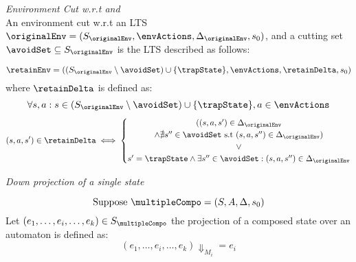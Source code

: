 
\begin{definition} \label{def:envcut} \emph{Environment Cut w.r.t \originalEnv and \avoidSet}\\
An environment cut w.r.t an LTS $\originalEnv = (S_{\originalEnv}, \envActions, \Delta_{\originalEnv}, s_{0})$, 
and a cutting set $\avoidSet \subseteq S_{\originalEnv}$ is the LTS described as follows:
\begin{minipage}[t]{.5\textwidth}
\begin{center}
\[\retainEnv = ((S_{\originalEnv}\setminus \avoidSet)\cup \{ \trapState \}, \envActions, \retainDelta, s_{0})\]
where $\retainDelta$ is defined as:
\[\forall s,a: s \in (S_{\originalEnv}\setminus \avoidSet)\cup \{ \trapState \}, a \in \envActions\]
\[
  (s,a,s') \in \retainDelta \iff \left\{\def\arraystretch{1.2}%
  \begin{array}{@{}c@{}}
    ((s,a,s') \in \Delta_{\originalEnv} \\
    \wedge \nexists s'' \in \avoidSet \text{ s.t } (s,a,s'') \in \Delta_{\originalEnv})\\
    \vee \\
    s' = \trapState \wedge \exists s'' \in \avoidSet: (s, a, s'') \in \Delta_{\originalEnv}\\
  \end{array}\right.
\]
\end{center}
\end{minipage}
\end{definition}


\begin{definition} \label{def:downProjectionState} \emph{Down projection of a single state}\\
\begin{minipage}[t]{.5\textwidth}
\[\text{Suppose }\multipleCompo = (S, A, \Delta, s_0)\]
Let $(e_1,\ldots,e_i,\ldots,e_k) \in S_{\multipleCompo}$ the projection of a composed state over an automaton is defined as: 
\[(e_1,\ldots,e_i,\ldots,e_k)\Downarrow_{M_i}=e_i\]
\end{minipage}
\end{definition}


